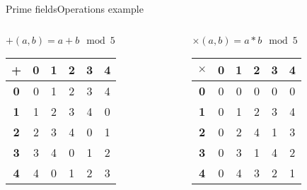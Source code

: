 \begin{frame}[t]{Prime fields}{Operations example}
	\begin{columns}
		\begin{column}{0.5\textwidth}
			\centering $+(a, b) = a + b \mod 5$				
			\begin{table}[]
				\begin{tabular}{c|ccccc}
					\textbf{+} & \textbf{0} & \textbf{1} & \textbf{2} & \textbf{3} & \textbf{4} \\ \hline
					\textbf{0} & 0          & 1          & 2          & 3          & 4          \\
					\textbf{1} & 1          & 2          & 3          & 4          & 0          \\
					\textbf{2} & 2          & 3          & 4          & 0          & 1          \\
					\textbf{3} & 3          & 4          & 0          & 1          & 2          \\
					\textbf{4} & 4          & 0          & 1          & 2          & 3         
				\end{tabular}
			\end{table}
		\end{column}
		\begin{column}{0.5\textwidth}  %
			\centering $\times(a, b) = a * b \mod 5$		
			\begin{table}[]
				\begin{tabular}{c|ccccc}
					\textbf{$\times$} & \textbf{0} & \textbf{1} & \textbf{2} & \textbf{3} & \textbf{4} \\ \hline
					\textbf{0} & 0          & 0          & 0          & 0          & 0          \\ 
					\textbf{1} & 0          & 1          & 2          & 3          & 4          \\
					\textbf{2} & 0          & 2          & 4          & 1          & 3          \\
					\textbf{3} & 0          & 3          & 1          & 4          & 2          \\
					\textbf{4} & 0          & 4          & 3          & 2          & 1         
				\end{tabular}
			\end{table}
		\end{column}
	\end{columns}
\end{frame}

